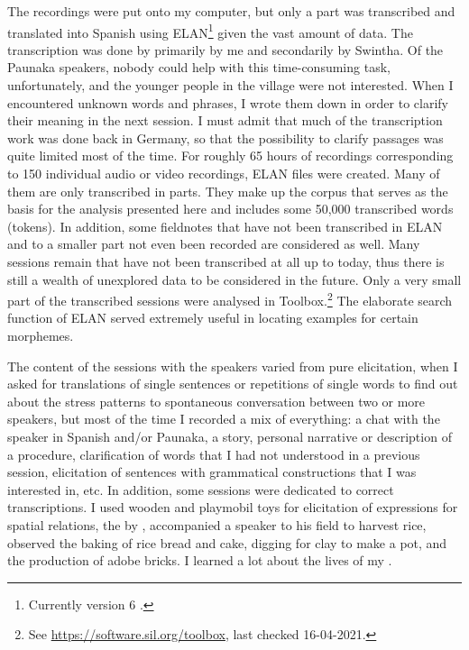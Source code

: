 The recordings were put onto my computer, but only a part was transcribed and translated into Spanish using ELAN\footnote{Currently version 6 \citep[cf.][]{ELAN2020}.} given the vast amount of data. The transcription was done by primarily by me and secondarily by Swintha. Of the Paunaka speakers, nobody could help with this time-consuming task, unfortunately, and the younger people in the village were not interested. When I encountered unknown words and phrases, I wrote them down in order to clarify their meaning in the next session. I must admit that much of the transcription work was done back in Germany, so that the possibility to clarify passages was quite limited most of the time. For roughly 65 hours of recordings corresponding to 150 individual audio or video recordings, ELAN files were created. Many of them are only transcribed in parts. They make up the corpus that serves as the basis for the analysis presented here and includes some 50,000 transcribed words (tokens). In addition, some fieldnotes that have not been transcribed in ELAN and to a smaller part not even been recorded are considered as well. Many sessions remain that have not been transcribed at all up to today, thus there is still a wealth of unexplored data to be considered in the future. Only a very small part of the transcribed sessions were analysed in Toolbox.\footnote{See \url{https://software.sil.org/toolbox}, last checked 16-04-2021.} The elaborate search function of ELAN served extremely useful in locating examples for certain morphemes.

The content of the sessions with the speakers varied from pure elicitation, when I asked for translations of single sentences or repetitions of single words to find out about the stress patterns to spontaneous conversation between two or more speakers, but most of the time I recorded a mix of everything: a chat with the speaker in Spanish and/or Paunaka, a story, personal narrative or description of a procedure, clarification of words that I had not understood in a previous session, elicitation of sentences with grammatical constructions that I was interested in, etc. In addition, some sessions were dedicated to correct transcriptions. I used wooden and playmobil toys for elicitation of expressions for spatial relations, the  by \citet[]{Mayer2003}, accompanied a speaker to his field to harvest rice, observed the baking of rice bread and cake, digging for clay to make a pot, and the production of adobe bricks. I learned a lot about the lives of my .


